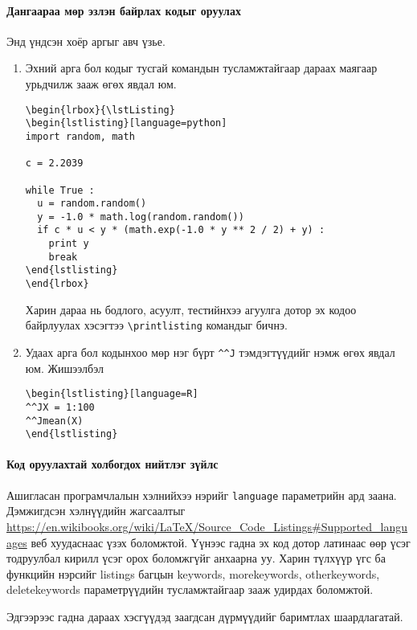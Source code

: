 \documentclass[10pt]{article}
\theoremstyle{definition}
\begin{document}
\paragraph{Дангаараа мөр эзлэн байрлах кодыг оруулах} Энд үндсэн хоёр аргыг авч үзье.
\begin{enumerate}
\item Эхний арга бол кодыг тусгай командын тусламжтайгаар дараах маягаар урьдчилж зааж өгөх явдал юм.
\begin{verbatim}
\begin{lrbox}{\lstListing}
\begin{lstlisting}[language=python]
import random, math

c = 2.2039

while True :
  u = random.random()
  y = -1.0 * math.log(random.random())
  if c * u < y * (math.exp(-1.0 * y ** 2 / 2) + y) :
    print y
    break
\end{lstlisting}
\end{lrbox}
\end{verbatim}
Харин дараа нь бодлого, асуулт, тестийнхээ агуулга дотор эх кодоо байрлуулах хэсэгтээ \verb|\printlisting| командыг бичнэ.
\item Удаах арга бол кодынхоо мөр нэг бүрт \verb|^^J| тэмдэгтүүдийг нэмж өгөх явдал юм.
Жишээлбэл
\begin{verbatim}
\begin{lstlisting}[language=R]
^^JX = 1:100
^^Jmean(X)
\end{lstlisting}
\end{verbatim}
\end{enumerate}

\paragraph{Код оруулахтай холбогдох нийтлэг зүйлс} Ашигласан програмчлалын хэлнийхээ нэрийг \texttt{language} параметрийн ард заана. Дэмжигдсэн хэлнүүдийн жагсаалтыг \url{https://en.wikibooks.org/wiki/LaTeX/Source_Code_Listings#Supported_languages} веб хуудаснаас үзэх боломжтой. Үүнээс гадна эх код дотор латинаас өөр үсэг тодруулбал кирилл үсэг орох боломжгүйг анхаарна уу. Харин түлхүүр үгс ба функцийн нэрсийг listings багцын keywords, morekeywords, otherkeywords, deletekeywords параметрүүдийн тусламжтайгаар зааж удирдах боломжтой.

\vspace{\baselineskip}

\par\noindent Эдгээрээс гадна дараах хэсгүүдэд заагдсан дүрмүүдийг баримтлах шаардлагатай.
\end{document}

